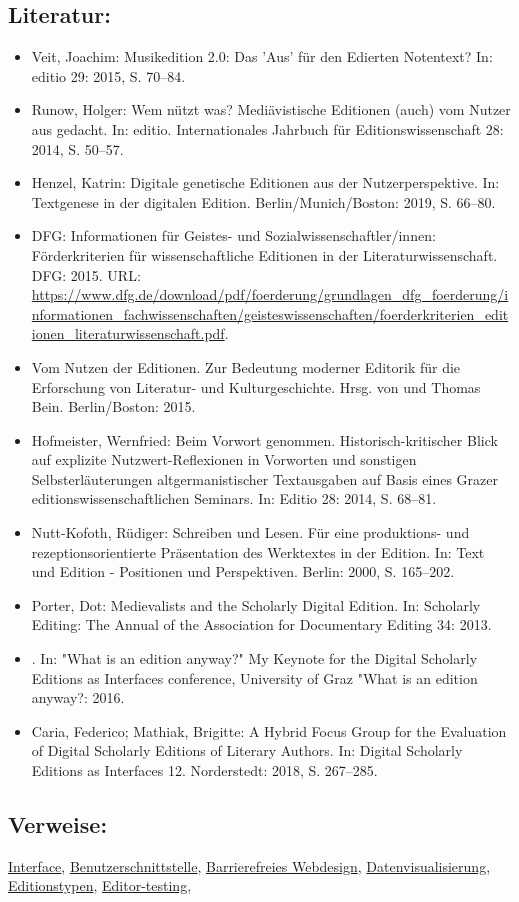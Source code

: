 \documentclass{article}
\begin{document}
        \subsection*{Literatur:}\begin{itemize}\item Veit, Joachim: Musikedition 2.0: Das 'Aus' für den Edierten Notentext? In: editio 29: 2015, S. 70–84.\item Runow, Holger: Wem nützt was? Mediävistische Editionen (auch) vom Nutzer aus gedacht. In: editio. Internationales Jahrbuch für Editionswissenschaft 28: 2014, S. 50–57.\item Henzel, Katrin: Digitale genetische Editionen aus der Nutzerperspektive. In: Textgenese in der digitalen Edition. Berlin/Munich/Boston: 2019, S. 66–80.\item DFG: Informationen für Geistes- und Sozialwissenschaftler/innen: Förderkriterien für wissenschaftliche Editionen in der Literaturwissenschaft. DFG: 2015. URL: \url{https://www.dfg.de/download/pdf/foerderung/grundlagen_dfg_foerderung/informationen_fachwissenschaften/geisteswissenschaften/foerderkriterien_editionen_literaturwissenschaft.pdf}.\item Vom Nutzen der Editionen. Zur Bedeutung moderner Editorik für die Erforschung von Literatur- und Kulturgeschichte. Hrsg. von  und Thomas Bein. Berlin/Boston: 2015.\item Hofmeister, Wernfried: Beim Vorwort genommen. Historisch-kritischer Blick auf explizite Nutzwert-Reflexionen in Vorworten und sonstigen Selbsterläuterungen altgermanistischer Textausgaben auf Basis eines Grazer editionswissenschaftlichen Seminars. In: Editio 28: 2014, S. 68–81.\item Nutt-Kofoth, Rüdiger: Schreiben und Lesen. Für eine produktions- und rezeptionsorientierte Präsentation des Werktextes in der Edition. In: Text und Edition - Positionen und Perspektiven. Berlin: 2000, S. 165–202.\item Porter, Dot: Medievalists and the Scholarly Digital Edition. In: Scholarly Editing: The Annual of the Association for Documentary Editing 34: 2013.\item . In: "What is an edition anyway?" My Keynote for the Digital Scholarly Editions as Interfaces conference, University of Graz "What is an edition anyway?: 2016.\item Caria, Federico; Mathiak, Brigitte: A Hybrid Focus Group for the Evaluation of Digital Scholarly Editions of Literary Authors. In: Digital Scholarly Editions as Interfaces 12. Norderstedt: 2018, S. 267–285.\end{itemize}\subsection*{Verweise:}\href{https://gams.uni-graz.at/o:konde.98}{Interface}, \href{https://gams.uni-graz.at/o:konde.18}{Benutzerschnittstelle}, \href{https://gams.uni-graz.at/o:konde.35}{Barrierefreies Webdesign}, \href{https://gams.uni-graz.at/o:konde.54}{Datenvisualisierung}, \href{https://gams.uni-graz.at/o:konde.76}{Editionstypen}, \href{https://gams.uni-graz.at/o:konde.78}{Editor-testing}, 
\end{document}
